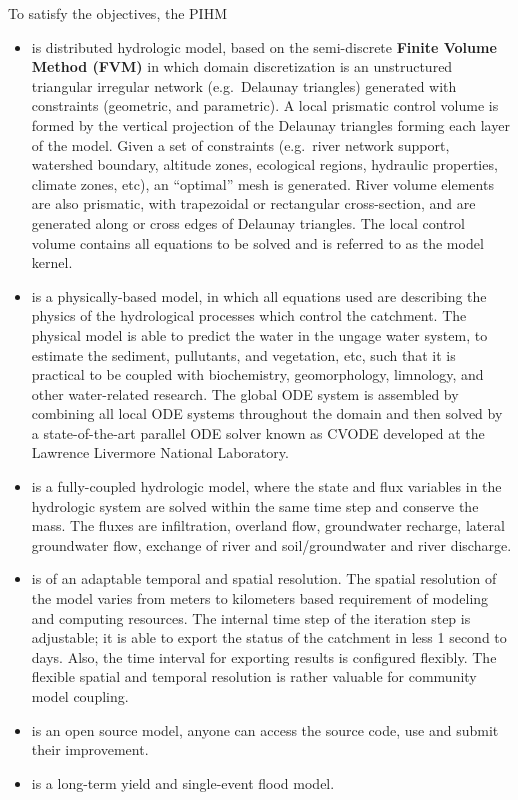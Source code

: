 \documentclass[]{scrbook}
\providecommand{\tightlist}{%
  \setlength{\itemsep}{0pt}\setlength{\parskip}{0pt}}
\begin{document}
To satisfy the objectives, the PIHM

\begin{itemize}
\tightlist
\item
  is distributed hydrologic model, based on the semi-discrete
  \textbf{Finite Volume Method (FVM)} in which domain discretization is
  an unstructured triangular irregular network (e.g.~Delaunay triangles)
  generated with constraints (geometric, and parametric). A local
  prismatic control volume is formed by the vertical projection of the
  Delaunay triangles forming each layer of the model. Given a set of
  constraints (e.g.~river network support, watershed boundary, altitude
  zones, ecological regions, hydraulic properties, climate zones, etc),
  an ``optimal'' mesh is generated. River volume elements are also
  prismatic, with trapezoidal or rectangular cross-section, and are
  generated along or cross edges of Delaunay triangles. The local
  control volume contains all equations to be solved and is referred to
  as the model kernel.
\item
  is a physically-based model, in which all equations used are
  describing the physics of the hydrological processes which control the
  catchment. The physical model is able to predict the water in the
  ungage water system, to estimate the sediment, pullutants, and
  vegetation, etc, such that it is practical to be coupled with
  biochemistry, geomorphology, limnology, and other water-related
  research. The global ODE system is assembled by combining all local
  ODE systems throughout the domain and then solved by a
  state-of-the-art parallel ODE solver known as CVODE developed at the
  Lawrence Livermore National Laboratory.
\item
  is a fully-coupled hydrologic model, where the state and flux
  variables in the hydrologic system are solved within the same time
  step and conserve the mass. The fluxes are infiltration, overland
  flow, groundwater recharge, lateral groundwater flow, exchange of
  river and soil/groundwater and river discharge.
\item
  is of an adaptable temporal and spatial resolution. The spatial
  resolution of the model varies from meters to kilometers based
  requirement of modeling and computing resources. The internal time
  step of the iteration step is adjustable; it is able to export the
  status of the catchment in less 1 second to days. Also, the time
  interval for exporting results is configured flexibly. The flexible
  spatial and temporal resolution is rather valuable for community model
  coupling.
\item
  is an open source model, anyone can access the source code, use and
  submit their improvement.
\item
  is a long-term yield and single-event flood model.
\end{itemize}
\end{document}
